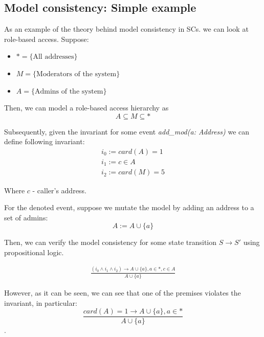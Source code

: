 \documentclass[oneside]{ecsproject}     %
\begin{document}
\newpage
\subsection{Model consistency: Simple example}

As an example of the theory behind model consistency in SCs. we can look at role-based access. Suppose:
\begin{itemize}
  \item $* = \{ \text{All addresses} \}$
  \item $M = \{ \text{Moderators of the system} \}$
  \item $A = \{ \text{Admins of the system} \}$
\end{itemize}

Then, we can model a role-based access hierarchy as 
\[ A \subseteq M \subseteq * \]

Subsequently, given the invariant for some event \textit{add\_mod(a: Address)} we can define following invariant:
\begin{equation*}
    \begin{gathered}
      i_0 := card(A) = 1 \\
      i_1 := c \in A \\
      i_2 := card(M) = 5
    \end{gathered}
  \end{equation*}

Where $c$ - caller's address.

For the denoted event, suppose we mutate the model by adding an address to a set of admins:
\begin{equation*}
  A := A \cup \{a\}
\end{equation*}

Then, we can verify the model consistency for some state transition $S \to S'$ using propositional logic.

\begin{equation*}
  \begin{gathered} 
   \frac{(i_0 \wedge i_1 \wedge i_2 ) \rightarrow A \cup \{a\}, a \in *, c \in A}{A \cup \{a\}}
  \end{gathered}
\end{equation*}

However, as it can be seen, we can see that one of the premises violates the invariant, in particular:
\begin{equation*}
  \frac{card(A) = 1 \rightarrow A \cup \{a\}, a \in *}{A \cup \{a\}}
\end{equation*}.
\end{document}
